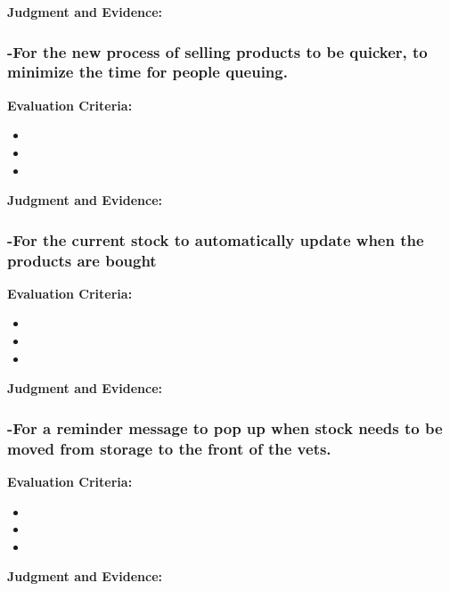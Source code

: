 \textbf{Judgment and Evidence:} \newline






\subsubsection{-For the new process of selling products to be quicker, to minimize the time for people queuing.}
\textbf{Evaluation Criteria:} \newline
\begin{itemize}
\item{}
\item{}
\item{}
\end{itemize}

\textbf{Judgment and Evidence:} \newline







\subsubsection{-For the current stock to automatically update when the products are bought}
\textbf{Evaluation Criteria:} \newline
\begin{itemize}
\item{}
\item{}
\item{}
\end{itemize}

\textbf{Judgment and Evidence:} \newline






\subsubsection{-For a reminder message to pop up when stock needs to be moved from storage to the front of the vets. }
\textbf{Evaluation Criteria:} \newline
\begin{itemize}
\item{}
\item{}
\item{}
\end{itemize}

\textbf{Judgment and Evidence:} \newline








